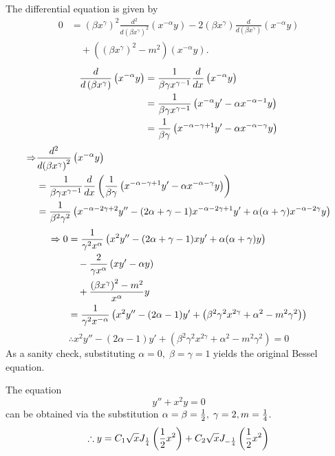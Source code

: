 \item

The differential equation is given by
\begin{align*}
    0
    &= {\left( \beta x^\gamma \right)}^2 \frac{d^2}{d{\left( \beta x^\gamma \right)}^2} \left( x^{-\alpha} y \right)
     - 2\left( \beta x^\gamma \right) \frac{d}{d\left( \beta x^\gamma \right)} \left( x^{-\alpha} y \right) \\
    &\quad + \left( {\left( \beta x^\gamma \right)}^2 - m^2 \right) \left( x^{-\alpha} y \right).
\end{align*}
\begin{align*}
    \frac{d}{d\left( \beta x^\gamma \right)} \left( x^{-\alpha} y \right)
    &= \frac{1}{\beta\gamma x^{\gamma - 1}} \frac{d}{dx} \left( x^{-\alpha} y \right) \\
    &= \frac{1}{\beta\gamma x^{\gamma - 1}} \left(
        x^{-\alpha} y' - \alpha x^{-\alpha - 1} y
    \right) \\
    &= \frac{1}{\beta\gamma} \left(
        x^{-\alpha-\gamma+1} y' - \alpha x^{-\alpha-\gamma} y
    \right)
\end{align*}
\begin{align*}
    \Rightarrow
    &\frac{d^2}{d{\left( \beta x^\gamma \right)}^2} \left( x^{-\alpha} y \right) \\
    &= \frac{1}{\beta\gamma x^{\gamma - 1}} \frac{d}{dx} \left(
        \frac{1}{\beta\gamma} \left(
            x^{-\alpha-\gamma+1} y' - \alpha x^{-\alpha-\gamma} y
        \right)
    \right) \\
    &= \frac{1}{\beta^2 \gamma^2} \left(
        x^{-\alpha-2\gamma+2} y''
        - (2\alpha+\gamma-1) x^{-\alpha-2\gamma+1} y'
        + \alpha(\alpha + \gamma) x^{-\alpha-2\gamma} y
    \right)
\end{align*}
\begin{align*}
    \Rightarrow 0
    &= \frac{1}{\gamma^2 x^{\alpha}} \left(
        x^2 y'' - (2\alpha+\gamma-1) xy' + \alpha(\alpha+\gamma) y
    \right) \\
    &\quad - \frac{2}{\gamma x^{\alpha}} \left(
        xy' - \alpha y
    \right) \\
    &\quad + \frac{{\left( \beta x^\gamma \right)}^2 - m^2}{x^\alpha} y \\
    &= \frac{1}{\gamma^2 x^{-\alpha}} \left(
        x^2 y''
        - (2\alpha - 1) y'
        + \left( \beta^2 \gamma^2 x^{2\gamma} + \alpha^2 - m^2 \gamma^2 \right)
    \right)
\end{align*}
\[
    \therefore  x^2 y''
    - (2\alpha - 1) y'
    + \left( \beta^2 \gamma^2 x^{2\gamma} + \alpha^2 - m^2 \gamma^2 \right)
    = 0
\]
As a sanity check, substituting $\alpha = 0,\; \beta =\gamma = 1$ yields
the original Bessel equation.

The equation
\[
    y'' + x^2 y = 0
\]
can be obtained via the substitution $\alpha =\beta = \frac{1}{2},\; \gamma = 2, m = \frac{1}{4}$.
\[
    \therefore y
    = C_1 \sqrt{x} J_{\frac{1}{4}}\left( \frac{1}{2} x^2 \right)
    + C_2 \sqrt{x} J_{-\frac{1}{4}}\left( \frac{1}{2} x^2 \right)
\]
